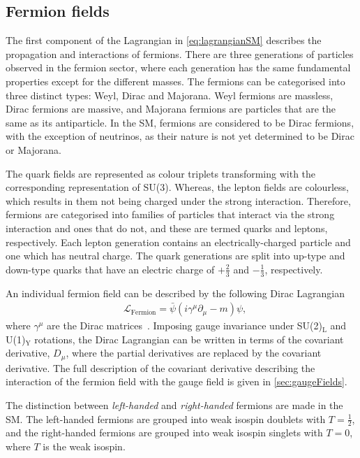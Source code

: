 \subsection{Fermion fields}\label{sec:fermionFields}
The first component of the Lagrangian in \cref{eq:lagrangianSM} describes the propagation and interactions of fermions. There are three generations of particles observed in the fermion sector, where each generation has the same fundamental properties except for the different masses. The fermions can be categorised into three distinct types: Weyl, Dirac and Majorana. Weyl fermions are massless, Dirac fermions are massive, and Majorana fermions are particles that are the same as its antiparticle. In the SM, fermions are considered to be Dirac fermions, with the exception of neutrinos, as their nature is not yet determined to be Dirac or Majorana. 

The quark fields are represented as colour triplets transforming with the corresponding representation of SU(3). Whereas, the lepton fields are colourless, which results in them not being charged under the strong interaction. Therefore, fermions are categorised into families of particles that interact via the strong interaction and ones that do not, and these are termed quarks and leptons, respectively. Each lepton generation contains an electrically-charged particle and one which has neutral charge. The quark generations are split into up-type and down-type quarks that have an electric charge of $+\frac{2}{3}$ and $-\frac{1}{3}$, respectively. 

An individual fermion field can be described by the following Dirac Lagrangian
\begin{equation}
    \label{eq:lagrangianFermion}
    \begin{aligned}
        & \mathcal{L}_\mathrm{Fermion} = \bar{\psi}\left(i\gamma^\mu \partial_\mu - m\right)\psi,
    \end{aligned}
\end{equation}
where $\gamma^{\mu}$ are the Dirac matrices~\cite{doi:10.1098/rspa.1928.0023}. Imposing gauge invariance under SU(2)$_\mathrm{L}$ and U(1)$_\mathrm{Y}$ rotations, the Dirac Lagrangian can be written in terms of the covariant derivative, $D_\mu$, where the partial derivatives are replaced by the covariant derivative. The full description of the covariant derivative describing the interaction of the fermion field with the gauge field is given in \cref{sec:gaugeFields}. 

The distinction between \emph{left-handed} and \emph{right-handed} fermions are made in the SM. The left-handed fermions are grouped into weak isospin doublets with $T = \frac{1}{2}$, and the right-handed fermions are grouped into weak isospin singlets with $T = 0$, where $T$ is the weak isospin. 

